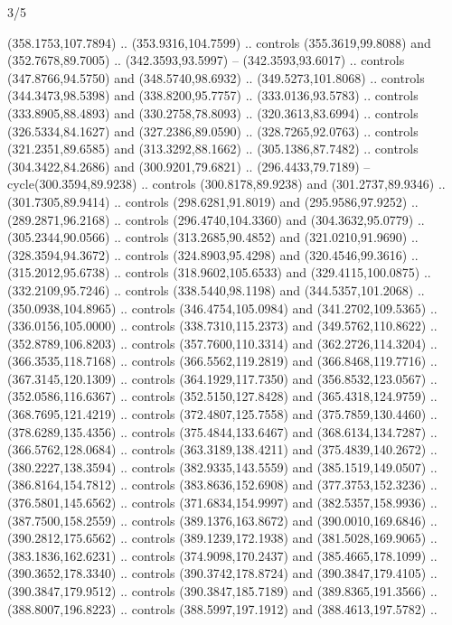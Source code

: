 \begin{flagdescription}{3/5}
\begin{scope}[shift={(0.5\flaglength,0.5\flagwidth)},scale=\flagwidth/510]
\begin{scope}[y=0.80pt, x=0.80pt, yscale=-1.06, xscale=1.06,yshift=-240pt,xshift=-400pt]
\begin{scope}[cm={{0.83333,0.0,0.0,0.83333,(154.64672,48.64761)}}]
  (358.1753,107.7894) .. (353.9316,104.7599) .. controls (355.3619,99.8088) and
  (352.7678,89.7005) .. (342.3593,93.5997) -- (342.3593,93.6017) .. controls
  (347.8766,94.5750) and (348.5740,98.6932) .. (349.5273,101.8068) .. controls
  (344.3473,98.5398) and (338.8200,95.7757) .. (333.0136,93.5783) .. controls
  (333.8905,88.4893) and (330.2758,78.8093) .. (320.3613,83.6994) .. controls
  (326.5334,84.1627) and (327.2386,89.0590) .. (328.7265,92.0763) .. controls
  (321.2351,89.6585) and (313.3292,88.1662) .. (305.1386,87.7482) .. controls
  (304.3422,84.2686) and (300.9201,79.6821) .. (296.4433,79.7189) --
  cycle(300.3594,89.9238) .. controls (300.8178,89.9238) and (301.2737,89.9346)
  .. (301.7305,89.9414) .. controls (298.6281,91.8019) and (295.9586,97.9252) ..
  (289.2871,96.2168) .. controls (296.4740,104.3360) and (304.3632,95.0779) ..
  (305.2344,90.0566) .. controls (313.2685,90.4852) and (321.0210,91.9690) ..
  (328.3594,94.3672) .. controls (324.8903,95.4298) and (320.4546,99.3616) ..
  (315.2012,95.6738) .. controls (318.9602,105.6533) and (329.4115,100.0875) ..
  (332.2109,95.7246) .. controls (338.5440,98.1198) and (344.5357,101.2068) ..
  (350.0938,104.8965) .. controls (346.4754,105.0984) and (341.2702,109.5365) ..
  (336.0156,105.0000) .. controls (338.7310,115.2373) and (349.5762,110.8622) ..
  (352.8789,106.8203) .. controls (357.7600,110.3314) and (362.2726,114.3204) ..
  (366.3535,118.7168) .. controls (366.5562,119.2819) and (366.8468,119.7716) ..
  (367.3145,120.1309) .. controls (364.1929,117.7350) and (356.8532,123.0567) ..
  (352.0586,116.6367) .. controls (352.5150,127.8428) and (365.4318,124.9759) ..
  (368.7695,121.4219) .. controls (372.4807,125.7558) and (375.7859,130.4460) ..
  (378.6289,135.4356) .. controls (375.4844,133.6467) and (368.6134,134.7287) ..
  (366.5762,128.0684) .. controls (363.3189,138.4211) and (375.4839,140.2672) ..
  (380.2227,138.3594) .. controls (382.9335,143.5559) and (385.1519,149.0507) ..
  (386.8164,154.7812) .. controls (383.8636,152.6908) and (377.3753,152.3236) ..
  (376.5801,145.6562) .. controls (371.6834,154.9997) and (382.5357,158.9936) ..
  (387.7500,158.2559) .. controls (389.1376,163.8672) and (390.0010,169.6846) ..
  (390.2812,175.6562) .. controls (389.1239,172.1938) and (381.5028,169.9065) ..
  (383.1836,162.6231) .. controls (374.9098,170.2437) and (385.4665,178.1099) ..
  (390.3652,178.3340) .. controls (390.3742,178.8724) and (390.3847,179.4105) ..
  (390.3847,179.9512) .. controls (390.3847,185.7189) and (389.8365,191.3566) ..
  (388.8007,196.8223) .. controls (388.5997,197.1912) and (388.4613,197.5782) ..

\end{scope}
\end{scope}
\end{scope}
\end{flagdescription}
